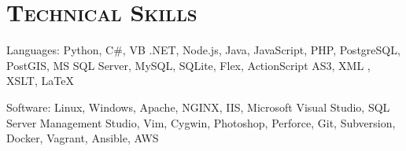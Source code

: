 \documentclass[12pt,a4paper]{article}
\newcommand{\sectionhead}{\normalfont\normalsize\scshape}
\begin{document}
\section*{\sectionhead Technical Skills}
\begin{description}
    \itemsep0pt
    \parskip5pt
    \item Languages: Python, C\#, VB .NET, Node.js, Java, JavaScript, PHP, PostgreSQL, PostGIS, MS SQL Server, MySQL, SQLite, Flex, ActionScript AS3, XML \Smiley, XSLT, \LaTeX
    \item Software: Linux, Windows, Apache, NGINX, IIS, Microsoft Visual Studio, SQL Server Management Studio, Vim, Cygwin, Photoshop, Perforce, Git, Subversion, Docker, Vagrant, Ansible, AWS
\end{description}
\end{document}
